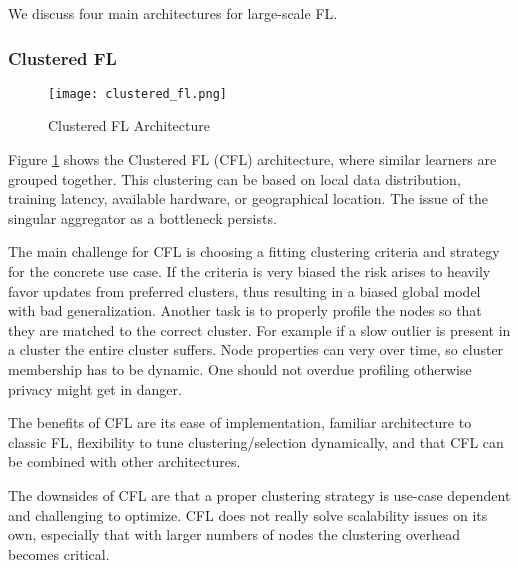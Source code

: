 We discuss four main architectures for large-scale FL.

\subsubsection{Clustered FL}

\begin{figure}[h]
    \centering
    \texttt{[image: clustered\_fl.png]}
    \caption{Clustered FL Architecture}
    \label{fig:clustered_fl}
\end{figure}
Figure \ref{fig:clustered_fl} shows the Clustered FL (CFL) architecture,
where similar learners are grouped together.
This clustering can be based on local data distribution, training latency,
available hardware, or geographical location.
The issue of the singular aggregator as a bottleneck persists.

The main challenge for CFL is choosing a fitting clustering criteria and strategy for the concrete use case.
If the criteria is very biased the risk arises to heavily favor updates from
preferred clusters, thus resulting in a biased global model with bad generalization.
Another task is to properly profile the nodes so that they are matched to the correct cluster.
For example if a slow outlier is present in a cluster the entire cluster suffers.
Node properties can very over time, so cluster membership has to be dynamic.
One should not overdue profiling otherwise privacy might get in danger.

The benefits of CFL are its ease of implementation,
familiar architecture to classic FL,
flexibility to tune clustering/selection dynamically,
and that CFL can be combined with other architectures.

The downsides of CFL are that a proper clustering strategy is 
use-case dependent and challenging to optimize.
CFL does not really solve scalability issues on its own,
especially that with larger numbers of nodes the clustering overhead becomes
critical.

